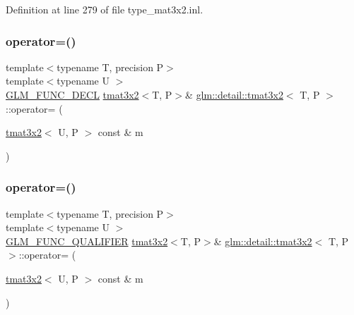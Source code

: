 Definition at line 279 of file type\+\_\+mat3x2.\+inl.

\mbox{\label{structglm_1_1detail_1_1tmat3x2_a14a1f4a49d2a1a04fa45935a33c47c3a}} 
\subsubsection{\texorpdfstring{operator=()}{operator=()}\hspace{0.1cm}{\footnotesize\ttfamily [2/3]}}
{\footnotesize\ttfamily template$<$typename T, precision P$>$ \\
template$<$typename U $>$ \\
\hyperlink{setup_8hpp_ab2d052de21a70539923e9bcbf6e83a51}{G\+L\+M\+\_\+\+F\+U\+N\+C\+\_\+\+D\+E\+CL} \hyperlink{structglm_1_1detail_1_1tmat3x2}{tmat3x2}$<$T, P$>$\& \hyperlink{structglm_1_1detail_1_1tmat3x2}{glm\+::detail\+::tmat3x2}$<$ T, P $>$\+::operator= (\begin{DoxyParamCaption}\item[{\hyperlink{structglm_1_1detail_1_1tmat3x2}{tmat3x2}$<$ U, P $>$ const \&}]{m }\end{DoxyParamCaption})}

\mbox{\label{structglm_1_1detail_1_1tmat3x2_a309bf07e7e7ba0f6f356d5848407602c}} 
\subsubsection{\texorpdfstring{operator=()}{operator=()}\hspace{0.1cm}{\footnotesize\ttfamily [3/3]}}
{\footnotesize\ttfamily template$<$typename T, precision P$>$ \\
template$<$typename U $>$ \\
\hyperlink{setup_8hpp_a33fdea6f91c5f834105f7415e2a64407}{G\+L\+M\+\_\+\+F\+U\+N\+C\+\_\+\+Q\+U\+A\+L\+I\+F\+I\+ER} \hyperlink{structglm_1_1detail_1_1tmat3x2}{tmat3x2}$<$T, P$>$\& \hyperlink{structglm_1_1detail_1_1tmat3x2}{glm\+::detail\+::tmat3x2}$<$ T, P $>$\+::operator= (\begin{DoxyParamCaption}\item[{\hyperlink{structglm_1_1detail_1_1tmat3x2}{tmat3x2}$<$ U, P $>$ const \&}]{m }\end{DoxyParamCaption})}




